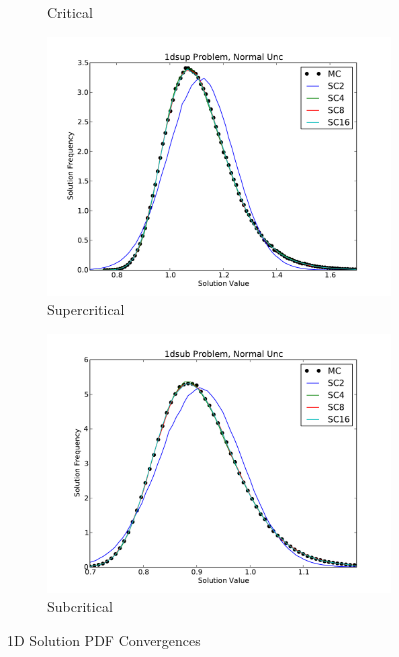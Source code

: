 \begin{landscape}
\begin{figure}[H]
\begin{subfigure}[b]{0.43\textwidth}
   \caption{Critical}
   \label{fig:1dcrit}
\end{subfigure}
\begin{subfigure}[b]{0.43\textwidth}
   \includegraphics[width=\textwidth]{../graphics/1dsup_normal_pdfs}
   \caption{Supercritical}
      \label{fig:1dsup}
\end{subfigure}
\begin{subfigure}[b]{0.43\textwidth}
   \includegraphics[width=\textwidth]{../graphics/1dsub_normal_pdfs}
   \caption{Subcritical}
      \label{fig:1dsub}
\end{subfigure}
\caption{1D Solution PDF Convergences}
\label{fig:1d 3pdfs}
\end{figure}
\end{landscape}

